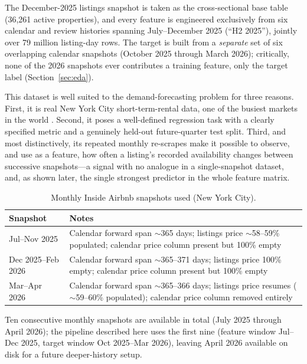 \documentclass[journal]{IEEEtran}
\begin{document}
The December-2025 listings snapshot is taken as the cross-sectional base table
(36{,}261 active properties), and every feature is engineered exclusively from
six calendar and review histories spanning July--December 2025 (``H2 2025''),
jointly over 79 million listing-day rows. The target is built from a
\emph{separate} set of six overlapping calendar snapshots (October 2025 through
March 2026); critically, none of the 2026 snapshots ever contributes a training
feature, only the target label (Section~\ref{sec:eda}).

This dataset is well suited to the demand-forecasting problem for three
reasons. First, it is real New York City short-term-rental data, one of the
busiest markets in the world \cite{kalehbasti2019}. Second, it poses a
well-defined regression task with a clearly specified metric and a genuinely
held-out future-quarter test split. Third, and most distinctively, its repeated
monthly re-scrapes make it possible to observe, and use as a feature, how often
a listing's recorded availability changes between successive snapshots---a
signal with no analogue in a single-snapshot dataset, and, as shown later, the
single strongest predictor in the whole feature matrix.

\begin{table}[!t]
\caption{Monthly Inside Airbnb snapshots used (New York City).}
\label{tab:snapshots}
\centering
\begin{tabular}{lp{5cm}}
\toprule
Snapshot & Notes \\
\midrule
Jul--Nov 2025 & Calendar forward span $\sim$365 days; listings price $\sim$58--59\% populated; calendar price column present but 100\% empty \\
Dec 2025--Feb 2026 & Calendar forward span $\sim$365--371 days; listings price 100\% empty; calendar price column present but 100\% empty \\
Mar--Apr 2026 & Calendar forward span $\sim$365--366 days; listings price resumes ($\sim$59--60\% populated); calendar price column removed entirely \\
\bottomrule
\end{tabular}
\end{table}

Ten consecutive monthly snapshots are available in total (July 2025 through
April 2026); the pipeline described here uses the first nine (feature window
Jul--Dec 2025, target window Oct 2025--Mar 2026), leaving April 2026 available
on disk for a future deeper-history setup.

\end{document}
